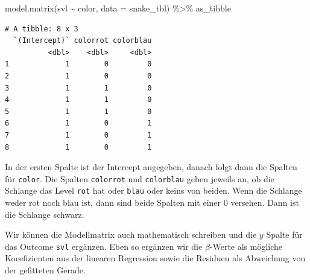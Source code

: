 \documentclass[
  letterpaper,
]{scrbook}
\newenvironment{Shaded}{\begin{snugshade}}{\end{snugshade}}
\newcommand{\AttributeTok}[1]{\textcolor[rgb]{0.40,0.45,0.13}{#1}}
\newcommand{\FunctionTok}[1]{\textcolor[rgb]{0.28,0.35,0.67}{#1}}
\newcommand{\NormalTok}[1]{\textcolor[rgb]{0.00,0.23,0.31}{#1}}
\newcommand{\SpecialCharTok}[1]{\textcolor[rgb]{0.37,0.37,0.37}{#1}}
\begin{document}
\begin{Shaded}
\begin{Highlighting}[]
\FunctionTok{model.matrix}\NormalTok{(svl }\SpecialCharTok{\textasciitilde{}}\NormalTok{ color, }\AttributeTok{data =}\NormalTok{ snake\_tbl) }\SpecialCharTok{\%\textgreater{}\%}\NormalTok{ as\_tibble}
\end{Highlighting}
\end{Shaded}

\begin{verbatim}
# A tibble: 8 x 3
  `(Intercept)` colorrot colorblau
          <dbl>    <dbl>     <dbl>
1             1        0         0
2             1        0         0
3             1        1         0
4             1        1         0
5             1        1         0
6             1        0         1
7             1        0         1
8             1        0         1
\end{verbatim}

In der ersten Spalte ist der Intercept angegeben, danach folgt dann die
Spalten für \texttt{color}. Die Spalten \texttt{colorrot} und
\texttt{colorblau} geben jeweils an, ob die Schlange das Level
\texttt{rot} hat oder \texttt{blau} oder keins von beiden. Wenn die
Schlange weder rot noch blau ist, dann sind beide Spalten mit einer 0
versehen. Dann ist die Schlange schwarz.

Wir können die Modellmatrix auch mathematisch schreiben und die \(y\)
Spalte für das Outcome \texttt{svl} ergänzen. Eben so ergänzen wir die
\(\beta\)-Werte als mögliche Koeefizienten aus der linearen Regression
sowie die Residuen als Abweichung von der gefitteten Gerade.
\end{document}
